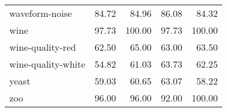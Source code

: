 \begin{longtable}{lrrrr}
                waveform-noise &   84.72 &    84.96 &  86.08 &  84.32 \\
                          wine &   97.73 &   100.00 &  97.73 & 100.00 \\
              wine-quality-red &   62.50 &    65.00 &  63.00 &  63.50 \\
            wine-quality-white &   54.82 &    61.03 &  63.73 &  62.25 \\
                         yeast &   59.03 &    60.65 &  63.07 &  58.22 \\
                           zoo &   96.00 &    96.00 &  92.00 & 100.00 \\
\end{longtable}
